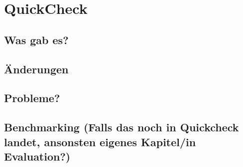 \chapter{QuickCheck}
\section{Was gab es?}
\section{Änderungen}
\section{Probleme?}
\section{Benchmarking (Falls das noch in Quickcheck landet, ansonsten eigenes Kapitel/in Evaluation?)}
